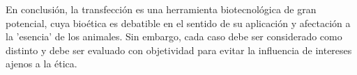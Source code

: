 \documentclass[fleqn,10pt]{SelfArx} %
\begin{document}
En conclusión, la transfección es una herramienta biotecnológica de gran potencial, cuya bioética es debatible en el sentido de su aplicación y afectación a la 'esencia' de los animales. Sin embargo, cada caso debe ser considerado como distinto y debe ser evaluado con objetividad para evitar la influencia de intereses ajenos a la ética.





\end{document}
